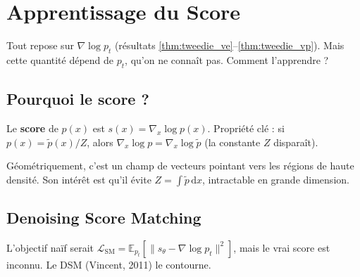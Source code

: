 \documentclass[12pt]{article}
\begin{document}

\section{Apprentissage du Score}

Tout repose sur $\nabla \log p_t$ (résultats \ref{thm:tweedie_ve}--\ref{thm:tweedie_vp}). Mais cette quantité dépend de $p_t$, qu'on ne connaît pas. Comment l'apprendre ?

\subsection{Pourquoi le score ?}

\begin{definitionbox}
\label{def:score}
Le \textbf{score} de $p(x)$ est $s(x) = \nabla_x \log p(x)$. Propriété clé : si $p(x) = \tilde{p}(x)/Z$, alors $\nabla_x \log p = \nabla_x \log \tilde{p}$ (la constante $Z$ disparaît).
\end{definitionbox}

Géométriquement, c'est un champ de vecteurs pointant vers les régions de haute densité. Son intérêt est qu'il évite $Z = \int \tilde{p}\, \mathrm{d}x$, intractable en grande dimension.

\subsection{Denoising Score Matching}

L'objectif naïf serait $\mathcal{L}_{\text{SM}} = \mathbb{E}_{p_t}[\|s_\theta - \nabla \log p_t\|^2]$, mais le vrai score est inconnu. Le DSM (Vincent, 2011) le contourne.
\end{document}
